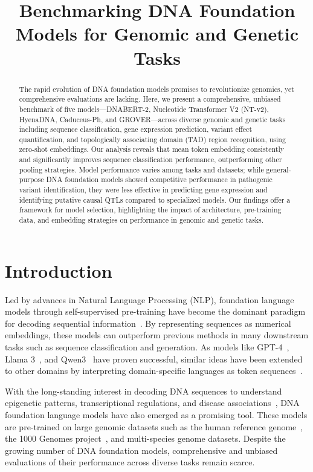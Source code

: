 \documentclass[11pt]{article}
\title{Benchmarking DNA Foundation Models for Genomic and Genetic Tasks}
\author{}
\date{}
\begin{document}
\maketitle

\begin{abstract}
The rapid evolution of DNA foundation models promises to revolutionize genomics, yet comprehensive evaluations are lacking. Here, we present a comprehensive, unbiased benchmark of five models---DNABERT-2, Nucleotide Transformer V2 (NT-v2), HyenaDNA, Caduceus-Ph, and GROVER---across diverse genomic and genetic tasks including sequence classification, gene expression prediction, variant effect quantification, and topologically associating domain (TAD) region recognition, using zero-shot embeddings. Our analysis reveals that mean token embedding consistently and significantly improves sequence classification performance, outperforming other pooling strategies. Model performance varies among tasks and datasets; while general-purpose DNA foundation models showed competitive performance in pathogenic variant identification, they were less effective in predicting gene expression and identifying putative causal QTLs compared to specialized models. Our findings offer a framework for model selection, highlighting the impact of architecture, pre-training data, and embedding strategies on performance in genomic and genetic tasks.
\end{abstract}

\section{Introduction}

Led by advances in Natural Language Processing (NLP), foundation language models through self-supervised pre-training have become the dominant paradigm for decoding sequential information~\citep{devlin2019bert}. By representing sequences as numerical embeddings, these models can outperform previous methods in many downstream tasks such as sequence classification and generation. As models like GPT-4~\citep{openai2023gpt4}, Llama 3~\citep{grattafiori2024llama3}, and Qwen3~\citep{yang2024qwen2} have proven successful, similar ideas have been extended to other domains by interpreting domain-specific languages as token sequences~\citep{lin2023evolutionary,cui2024scgpt,madani2023large}.

With the long-standing interest in decoding DNA sequences to understand epigenetic patterns, transcriptional regulations, and disease associations~\citep{nurk2022epigenetic,ober2015understanding}, DNA foundation language models have also emerged as a promising tool. These models are pre-trained on large genomic datasets such as the human reference genome~\citep{nurk2022complete}, the 1000 Genomes project~\citep{byrska2022high}, and multi-species genome datasets. Despite the growing number of DNA foundation models, comprehensive and unbiased evaluations of their performance across diverse tasks remain scarce.
\end{document}
